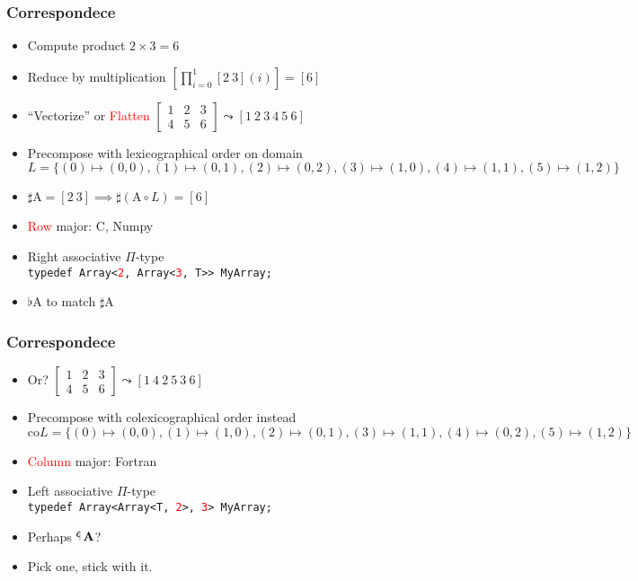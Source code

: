 \documentclass[xetex,mathserif,serif]{beamer}
\let\amsleadsto\leadsto
\let\leadsto\amsleadsto
\newcommand\mrm[1]{\mathrm{#1}}
\newcommand\brm[1]{\bm{\mrm{#1}}}
\newcommand\tlaf{\mathop{\rotatebox[origin=c]{180}{$\flat$}}}
\newcommand\NB[1]{\textcolor{red}{#1}}
\begin{document}
\begin{frame}
  \frametitle{Correspondece}
  \begin{itemize}%
    \item Compute product $2 \times 3 = 6$
    \item Reduce by multiplication $\left[\prod_{i=0}^1 [2\ 3](i)\right] = [ 6 ]$
    \item ``Vectorize'' or \NB{Flatten} $
      \begin{bmatrix}
        1 & 2 & 3 \\
        4 & 5 & 6
      \end{bmatrix} \leadsto [1\ 2\ 3\ 4\ 5\ 6]
      $
    \item Precompose with lexicographical order on domain $
      L = \{(0) \mapsto (0,0), (1)\mapsto (0,1), (2)\mapsto(0,2), (3)\mapsto(1,0), (4)\mapsto(1,1), (5)\mapsto(1,2)\}
      $
    \item $\sharp \brm A = [2\ 3] \implies \sharp (\brm A \circ L) = [6] $
    \item \NB{Row} major: C, Numpy
    \item Right associative $\Pi$-type\\
      \texttt{typedef Array<\NB 2, Array<\NB 3, T>> MyArray;}
    \item $\flat \brm A$ to match $\sharp \brm A$
  \end{itemize}
\end{frame}

\begin{frame}
  \frametitle{Correspondece}
  \begin{itemize}%
    \item Or? $
      \begin{bmatrix}
        1 & 2 & 3 \\
        4 & 5 & 6
      \end{bmatrix} \leadsto [1\ 4\ 2\ 5\ 3\ 6]
      $ 
    \item Precompose with colexicographical order instead
      $\mrm{co}L = \{ (0)\mapsto(0,0), (1)\mapsto(1,0), (2)\mapsto(0,1), (3)\mapsto(1,1), (4)\mapsto(0,2), (5)\mapsto(1,2) \}$
    \item \NB{Column} major: Fortran
    \item Left associative $\Pi$-type \\
      \texttt{typedef Array<Array<T, \NB 2>, \NB 3> MyArray;}
    \item Perhaps $\tlaf \brm A$?
    \item Pick one, stick with it.
  \end{itemize}
\end{frame}
\end{document}
